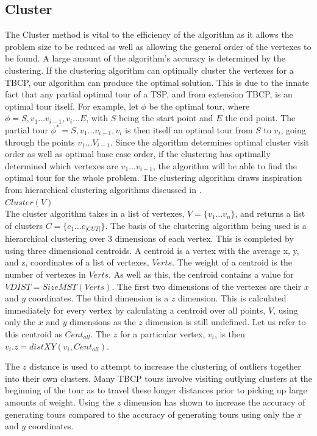 \documentclass[sigconf, anonymous, pdftex]{acmart}
\begin{document}
\subsection{Cluster}

The Cluster method is vital to the efficiency of the algorithm as it allows the problem size to be reduced as well as allowing the general order of the vertexes to be found. A large amount of the algorithm's accuracy is determined by the clustering. If the clustering algorithm can optimally cluster the vertexes for a TBCP, our algorithm can produce the optimal solution. This is due to the innate fact that any partial optimal tour of a TSP, and from extension TBCP, is an optimal tour itself. For example, let $\phi$ be the optimal tour, where $\phi = S, v_1 \dots v_{i-1}, v_i \dots E$, with $S$ being the start point and $E$ the end point. The partial tour $\phi^* = S, v_1 \dots v_{i-1}, v_i$ is then itself an optimal tour from $S$ to $v_i$, going through the points $v_1 \dots V_{i-1}$. Since the algorithm determines optimal cluster visit order as well as optimal base case order, if the clustering has optimally determined which vertexes are $v_1 \dots v_{i-1}$, the algorithm will be able to find the optimal tour for the whole problem. The clustering algorithm draws inspiration from hierarchical clustering algorithms discussed in \cite{clusteringAlgorithms}.\\

$Cluster(V)$\\

The cluster algorithm takes in a list of vertexes, $V = \{ v_1 \dots v_n \}$, and returns a list of clusters $C = \{ c_1 \dots c_|CUT| \}$. The basis of the clustering algorithm being used is a hierarchical clustering over 3 dimensions of each vertex. This is completed by using three dimensional centroids. A centroid is a vertex with the average x, y, and z, coordinates of a list of vertexes, $Verts$. The weight of a centroid is the number of vertexes in $Verts$. As well as this, the centroid contains a value for $VDIST = SizeMST(Verts)$. The first two dimensions of the vertexes are their $x$ and $y$ coordinates. The third dimension is a $z$ dimension. This is calculated immediately for every vertex by calculating a centroid over all points, $V$, using only the $x$ and $y$ dimensions as the $z$ dimension is still undefined. Let us refer to this centroid as $Cent_{all}$. The $z$ for a particular vertex, $v_i$, is then $v_i.z = distXY(v_i, Cent_{all})$.

The $z$ distance is used to attempt to increase the clustering of outliers together into their own clusters. Many TBCP tours involve visiting outlying clusters at the beginning of the tour as to travel these longer distances prior to picking up large amounts of weight. Using the $z$ dimension has shown to increase the accuracy of generating tours compared to the accuracy of generating tours using only the $x$ and $y$ coordinates.
\end{document}
